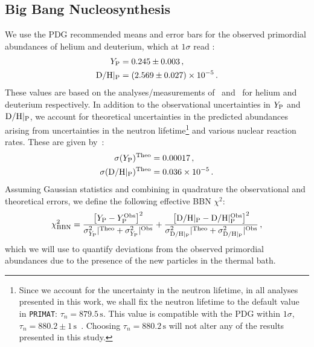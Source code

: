 \subsection{Big Bang Nucleosynthesis}\label{sec:BBN_data}

We use the PDG recommended means and error bars for the observed primordial abundances of helium and deuterium, which at $1\sigma$ read \cite{pdg}:
\begin{align}
Y_{\rm P} 	            &= 0.245 \pm 0.003 \label{eq:Yp}\, , \\
{\rm D/H}|_{\rm P}   	&= (2.569  \pm 0.027) \times 10^{-5} \label{eq:DH} \,.
\end{align}
These values are based on the analyses/measurements of~\cite{2017RMxAC..49..181P,Aver:2015iza,Izotov:2014fga} and~\cite{Cooke:2016rky,Balashev:2015hoe,2018MNRAS.477.5536Z,Riemer-Sorensen:2017pey} for helium and deuterium respectively. 
In addition to the observational uncertainties in $Y_{\rm P}$ and ${\rm D/H}|_{\rm P}$, we account for theoretical uncertainties in the predicted abundances arising from uncertainties in the neutron lifetime\footnote{Since we account for the uncertainty in the neutron lifetime, in all analyses presented in this work, we shall fix the neutron lifetime to the default value in \texttt{PRIMAT}: $\tau_n =  879.5\,\text{s}$. This value is compatible with the PDG within $1\sigma$, $\tau_n = 880.2\pm 1\,\text{s}$~\cite{pdg}. Choosing $\tau_n = 880.2\,\text{s}$ will not alter any of the results presented in this study.} and various nuclear reaction rates. These are given by~\cite{Pitrou:2018cgg}:
\begin{align}
\sigma(Y_{\rm P})^{\rm Theo} 	        		&= 0.00017 \,, \\
\sigma({\rm D/H}|_{\rm P} )^{\rm Theo}   	&= 0.036 \times 10^{-5} \label{eq:sigmaDH} \, .
\end{align}
Assuming Gaussian statistics and combining in quadrature the observational and theoretical errors, we define the following effective BBN $\chi^2$: 
\begin{align}\label{eq:chiBBN}
\chi_{\rm BBN}^2 = \frac{\left[Y_{\rm P} - Y_{\rm P}^{\rm Obs}\right]^2}{\sigma_{Y_{\rm P}}^2|{}^{\rm Theo} + \sigma_{Y_{\rm P}}^2|{}^{\rm Obs}} + \frac{\left[{\rm D/H}|_{\rm P} - {\rm D/H}|_{\rm P}^{\rm Obs}\right]^2}{\sigma_{{\rm D/H}|_{\rm P}}^2|{}^{\rm Theo} + \sigma_{{\rm D/H}|_{\rm P}}^2|{}^{\rm Obs}} \, ,
\end{align}
which we will use to quantify deviations from the observed primordial abundances due to the presence of the new particles in the thermal bath.


